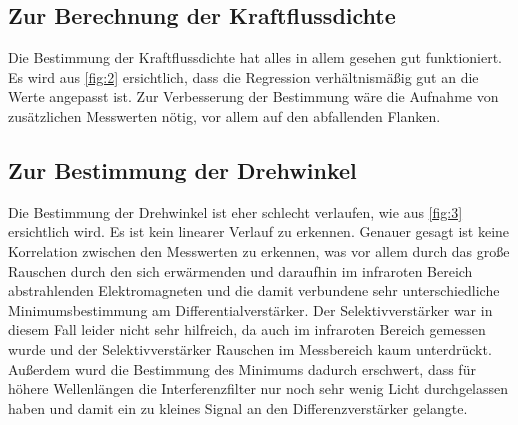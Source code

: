 \subsection{Zur Berechnung der Kraftflussdichte}
Die Bestimmung der Kraftflussdichte hat alles in allem gesehen gut funktioniert.
Es wird aus \ref{fig:2} ersichtlich, dass die Regression verhältnismäßig gut
an die Werte angepasst ist. Zur Verbesserung der Bestimmung wäre die Aufnahme von
zusätzlichen Messwerten nötig, vor allem auf den abfallenden Flanken.
\subsection{Zur Bestimmung der Drehwinkel}
Die Bestimmung der Drehwinkel ist eher schlecht verlaufen, wie aus \ref{fig:3}
ersichtlich wird. Es ist kein linearer Verlauf zu erkennen. Genauer gesagt ist
keine Korrelation zwischen den Messwerten zu erkennen, was vor allem durch das große
Rauschen durch den sich erwärmenden und daraufhin im infraroten Bereich abstrahlenden
Elektromagneten und die damit verbundene sehr unterschiedliche Minimumsbestimmung
am Differentialverstärker. Der Selektivverstärker war in diesem Fall leider
nicht sehr hilfreich, da auch im infraroten Bereich gemessen wurde und der Selektivverstärker
Rauschen im Messbereich kaum unterdrückt. Außerdem wurd die Bestimmung des Minimums dadurch erschwert,
dass für höhere Wellenlängen die Interferenzfilter nur noch sehr wenig Licht durchgelassen
haben und damit ein zu kleines Signal an den Differenzverstärker gelangte.
